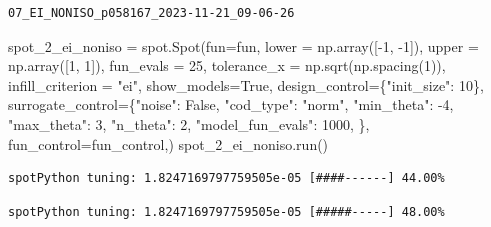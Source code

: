 \documentclass[
  letterpaper,
  DIV=11,
  numbers=noendperiod]{scrreprt}
\newenvironment{Shaded}{\begin{snugshade}}{\end{snugshade}}
\newcommand{\DecValTok}[1]{\textcolor[rgb]{0.68,0.00,0.00}{#1}}
\newcommand{\NormalTok}[1]{\textcolor[rgb]{0.00,0.23,0.31}{#1}}
\newcommand{\OperatorTok}[1]{\textcolor[rgb]{0.37,0.37,0.37}{#1}}
\newcommand{\StringTok}[1]{\textcolor[rgb]{0.13,0.47,0.30}{#1}}
\newcommand{\VariableTok}[1]{\textcolor[rgb]{0.07,0.07,0.07}{#1}}
\begin{document}
\begin{verbatim}
07_EI_NONISO_p058167_2023-11-21_09-06-26
\end{verbatim}

\begin{Shaded}
\begin{Highlighting}[]
\NormalTok{spot\_2\_ei\_noniso }\OperatorTok{=}\NormalTok{ spot.Spot(fun}\OperatorTok{=}\NormalTok{fun,}
\NormalTok{                   lower }\OperatorTok{=}\NormalTok{ np.array([}\OperatorTok{{-}}\DecValTok{1}\NormalTok{, }\OperatorTok{{-}}\DecValTok{1}\NormalTok{]),}
\NormalTok{                   upper }\OperatorTok{=}\NormalTok{ np.array([}\DecValTok{1}\NormalTok{, }\DecValTok{1}\NormalTok{]),}
\NormalTok{                   fun\_evals }\OperatorTok{=} \DecValTok{25}\NormalTok{,}
\NormalTok{                   tolerance\_x }\OperatorTok{=}\NormalTok{ np.sqrt(np.spacing(}\DecValTok{1}\NormalTok{)),}
\NormalTok{                   infill\_criterion }\OperatorTok{=} \StringTok{"ei"}\NormalTok{,}
\NormalTok{                   show\_models}\OperatorTok{=}\VariableTok{True}\NormalTok{,}
\NormalTok{                   design\_control}\OperatorTok{=}\NormalTok{\{}\StringTok{"init\_size"}\NormalTok{: }\DecValTok{10}\NormalTok{\},}
\NormalTok{                   surrogate\_control}\OperatorTok{=}\NormalTok{\{}\StringTok{"noise"}\NormalTok{: }\VariableTok{False}\NormalTok{,}
                                      \StringTok{"cod\_type"}\NormalTok{: }\StringTok{"norm"}\NormalTok{,}
                                      \StringTok{"min\_theta"}\NormalTok{: }\OperatorTok{{-}}\DecValTok{4}\NormalTok{,}
                                      \StringTok{"max\_theta"}\NormalTok{: }\DecValTok{3}\NormalTok{,}
                                      \StringTok{"n\_theta"}\NormalTok{: }\DecValTok{2}\NormalTok{,}
                                      \StringTok{"model\_fun\_evals"}\NormalTok{: }\DecValTok{1000}\NormalTok{,}
\NormalTok{                                      \},}
\NormalTok{                    fun\_control}\OperatorTok{=}\NormalTok{fun\_control,)}
\NormalTok{spot\_2\_ei\_noniso.run()}
\end{Highlighting}
\end{Shaded}

\begin{verbatim}
spotPython tuning: 1.8247169797759505e-05 [####------] 44.00% 
\end{verbatim}

\begin{verbatim}
spotPython tuning: 1.8247169797759505e-05 [#####-----] 48.00% 
\end{verbatim}
\end{document}
